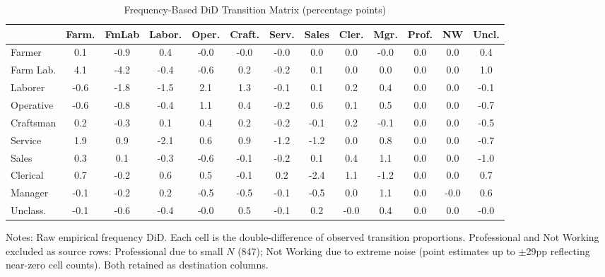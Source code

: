 \documentclass[12pt]{article}
\begin{document}
\begin{table}[H]
\centering
\caption{Frequency-Based DiD Transition Matrix (percentage points)}
\label{tab:freq_matrix}
\begin{adjustbox}{max width=\textwidth}
\begin{threeparttable}
\begin{tabular}{l*{12}{S[table-format=-2.1,table-auto-round]}}
\toprule
& {Farm.} & {FmLab} & {Labor.} & {Oper.} & {Craft.} & {Serv.} & {Sales} & {Cler.} & {Mgr.} & {Prof.} & {NW} & {Uncl.} \\
\midrule
Farmer     &  0.1 & -0.9 &  0.4 & -0.0 & -0.0 & -0.0 &  0.0 &  0.0 & -0.0 & 0.0 &  0.0 &  0.4 \\
Farm Lab.  &  4.1 & -4.2 & -0.4 & -0.6 &  0.2 & -0.2 &  0.1 &  0.0 &  0.0 & 0.0 &  0.0 &  1.0 \\
Laborer    & -0.6 & -1.8 & -1.5 &  2.1 &  1.3 & -0.1 &  0.1 &  0.2 &  0.4 & 0.0 &  0.0 & -0.1 \\
Operative  & -0.6 & -0.8 & -0.4 &  1.1 &  0.4 & -0.2 &  0.6 &  0.1 &  0.5 & 0.0 &  0.0 & -0.7 \\
Craftsman  &  0.2 & -0.3 &  0.1 &  0.4 &  0.2 & -0.2 & -0.1 &  0.2 & -0.1 & 0.0 &  0.0 & -0.5 \\
Service    &  1.9 &  0.9 & -2.1 &  0.6 &  0.9 & -1.2 & -1.2 &  0.0 &  0.8 & 0.0 &  0.0 & -0.7 \\
Sales      &  0.3 &  0.1 & -0.3 & -0.6 & -0.1 & -0.2 &  0.1 &  0.4 &  1.1 & 0.0 &  0.0 & -1.0 \\
Clerical   &  0.7 & -0.2 &  0.6 &  0.5 & -0.1 &  0.2 & -2.4 &  1.1 & -1.2 & 0.0 &  0.0 &  0.7 \\
Manager    & -0.1 & -0.2 &  0.2 & -0.5 & -0.5 & -0.1 & -0.5 &  0.0 &  1.1 & 0.0 & -0.0 &  0.6 \\
Unclass.   & -0.1 & -0.6 & -0.4 & -0.0 &  0.5 & -0.1 &  0.2 & -0.0 &  0.4 & 0.0 &  0.0 & -0.0 \\
\bottomrule
\end{tabular}
\begin{tablenotes}[flushleft]
\small
\item Notes: Raw empirical frequency DiD. Each cell is the double-difference of observed transition proportions. Professional and Not Working excluded as source rows: Professional due to small $N$ (847); Not Working due to extreme noise (point estimates up to $\pm$29pp reflecting near-zero cell counts). Both retained as destination columns.
\end{tablenotes}
\end{threeparttable}
\end{adjustbox}
\end{table}
\end{document}
